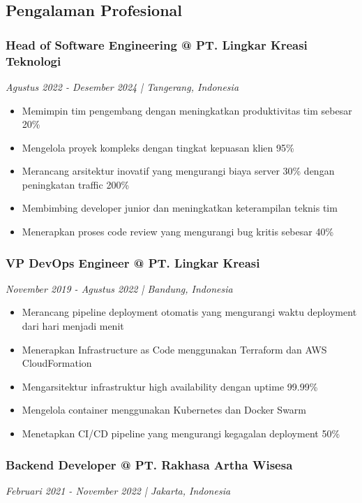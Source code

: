 \subsection*{Pengalaman Profesional}

\subsubsection*{Head of Software Engineering @ PT. Lingkar Kreasi Teknologi}
\textit{Agustus 2022 - Desember 2024 | Tangerang, Indonesia}

\begin{itemize}
\item Memimpin tim pengembang dengan meningkatkan produktivitas tim sebesar 20\%
\item Mengelola proyek kompleks dengan tingkat kepuasan klien 95\%
\item Merancang arsitektur inovatif yang mengurangi biaya server 30\% dengan peningkatan traffic 200\%
\item Membimbing developer junior dan meningkatkan keterampilan teknis tim
\item Menerapkan proses code review yang mengurangi bug kritis sebesar 40\%
\end{itemize}

\subsubsection*{VP DevOps Engineer @ PT. Lingkar Kreasi}
\textit{November 2019 - Agustus 2022 | Bandung, Indonesia}

\begin{itemize}
\item Merancang pipeline deployment otomatis yang mengurangi waktu deployment dari hari menjadi menit
\item Menerapkan Infrastructure as Code menggunakan Terraform dan AWS CloudFormation
\item Mengarsitektur infrastruktur high availability dengan uptime 99.99\%
\item Mengelola container menggunakan Kubernetes dan Docker Swarm
\item Menetapkan CI/CD pipeline yang mengurangi kegagalan deployment 50\%
\end{itemize}

\subsubsection*{Backend Developer @ PT. Rakhasa Artha Wisesa}
\textit{Februari 2021 - November 2022 | Jakarta, Indonesia}

